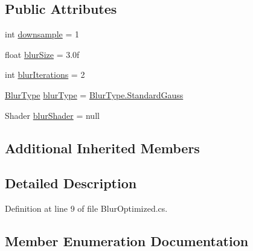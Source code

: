 \subsection*{Public Attributes}
\begin{DoxyCompactItemize}
\item 
int \mbox{\hyperlink{class_unity_standard_assets_1_1_image_effects_1_1_blur_optimized_a19e07e0ba50a164698d1b78884dff182}{downsample}} = 1
\item 
float \mbox{\hyperlink{class_unity_standard_assets_1_1_image_effects_1_1_blur_optimized_a76eb4bf88962770b9791b64df3c60408}{blur\+Size}} = 3.\+0f
\item 
int \mbox{\hyperlink{class_unity_standard_assets_1_1_image_effects_1_1_blur_optimized_acc965e0aba51c9917b577449e13eb61f}{blur\+Iterations}} = 2
\item 
\mbox{\hyperlink{class_unity_standard_assets_1_1_image_effects_1_1_blur_optimized_a5e014aebbf344dbbec6748cd537b0790}{Blur\+Type}} \mbox{\hyperlink{class_unity_standard_assets_1_1_image_effects_1_1_blur_optimized_a65821cd7517fbb96a9333b9a14df967d}{blur\+Type}} = \mbox{\hyperlink{class_unity_standard_assets_1_1_image_effects_1_1_blur_optimized_a5e014aebbf344dbbec6748cd537b0790acf52c93fe9c4abb6723ffded2ad3d603}{Blur\+Type.\+Standard\+Gauss}}
\item 
Shader \mbox{\hyperlink{class_unity_standard_assets_1_1_image_effects_1_1_blur_optimized_ae2dcb0d61dd83dfca75a9fa3676d6a3c}{blur\+Shader}} = null
\end{DoxyCompactItemize}
\subsection*{Additional Inherited Members}


\subsection{Detailed Description}


Definition at line 9 of file Blur\+Optimized.\+cs.



\subsection{Member Enumeration Documentation}
\mbox{\label{class_unity_standard_assets_1_1_image_effects_1_1_blur_optimized_a5e014aebbf344dbbec6748cd537b0790}} 
